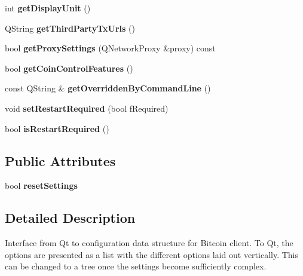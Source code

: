 \begin{DoxyCompactItemize}
\item 
\mbox{\label{class_options_model_a3b6e4d4ef42be3aaba315b8cd14f468e}} 
int {\bfseries get\+Display\+Unit} ()
\item 
\mbox{\label{class_options_model_a6cb6057025ce07b7dbc24761ffb6b493}} 
Q\+String {\bfseries get\+Third\+Party\+Tx\+Urls} ()
\item 
\mbox{\label{class_options_model_a0fa582a801df3753c2c50840c40bb350}} 
bool {\bfseries get\+Proxy\+Settings} (Q\+Network\+Proxy \&proxy) const
\item 
\mbox{\label{class_options_model_ace6c871068f613aee277e37bfdc988c0}} 
bool {\bfseries get\+Coin\+Control\+Features} ()
\item 
\mbox{\label{class_options_model_ac5d555492fa4d6bba68d00e798efca50}} 
const Q\+String \& {\bfseries get\+Overridden\+By\+Command\+Line} ()
\item 
\mbox{\label{class_options_model_af25171526a18c4746132ff199e0b1d71}} 
void {\bfseries set\+Restart\+Required} (bool f\+Required)
\item 
\mbox{\label{class_options_model_a75c15f2cb96ee8efe7b9e756e5c8e69c}} 
bool {\bfseries is\+Restart\+Required} ()
\end{DoxyCompactItemize}
\subsection*{Public Attributes}
\begin{DoxyCompactItemize}
\item 
\mbox{\label{class_options_model_a5c6b1f952c5635b2c735923948179517}} 
bool {\bfseries reset\+Settings}
\end{DoxyCompactItemize}


\subsection{Detailed Description}
Interface from Qt to configuration data structure for Bitcoin client. To Qt, the options are presented as a list with the different options laid out vertically. This can be changed to a tree once the settings become sufficiently complex. 

